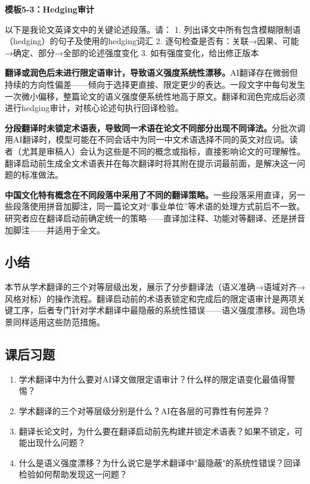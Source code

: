 \textbf{模板5-3：Hedging审计}

\begin{tcolorbox}[promptbox]
以下是我论文英译文中的关键论述段落。请：
1. 列出译文中所有包含模糊限制语（hedging）的句子及使用的hedging词汇
2. 逐句检查是否有：关联→因果、可能→确定、部分→全部的论述强度变化
3. 如有强度变化，给出修正版本
\end{tcolorbox}



\begin{mistakebox}

\textbf{翻译或润色后未进行限定语审计，导致语义强度系统性漂移。}AI翻译存在微弱但持续的方向性偏差——倾向于选择更直接、限定更少的表达。一段文字中每句发生一次微小偏移，整篇论文的语义强度便系统性地高于原文。翻译和润色完成后必须进行hedging审计，对核心论述句执行回译检验。

\smallskip

\textbf{分段翻译时未锁定术语表，导致同一术语在论文不同部分出现不同译法。}分批次调用AI翻译时，模型可能在不同会话中为同一中文术语选择不同的英文对应词。读者（尤其是审稿人）会认为这些是不同的概念或指标，直接影响论文的可理解性。翻译启动前生成全文术语表并在每次翻译时将其附在提示词最前面，是解决这一问题的标准做法。

\smallskip

\textbf{中国文化特有概念在不同段落中采用了不同的翻译策略。}一些段落采用直译，另一些段落使用拼音加脚注，同一篇论文对``事业单位''等术语的处理方式前后不一致。研究者应在翻译启动前确定统一的策略——直译加注释、功能对等翻译、还是拼音加脚注——并适用于全文。

\end{mistakebox}

\subsection*{小结}
本节从学术翻译的三个对等层级出发，展示了分步翻译法（语义准确→语域对齐→风格对标）的操作流程。翻译启动前的术语表锁定和完成后的限定语审计是两项关键工序，后者专门针对学术翻译中最隐蔽的系统性错误——语义强度漂移。润色场景同样适用这些防范措施。

\bigskip
\subsection*{课后习题}
\begin{enumerate}
\setlength{\itemsep}{6pt}

\item 学术翻译中为什么要对AI译文做限定语审计？什么样的限定语变化最值得警惕？

\item 学术翻译的三个对等层级分别是什么？AI在各层的可靠性有何差异？

\item 翻译长论文时，为什么要在翻译启动前先构建并锁定术语表？如果不锁定，可能出现什么问题？

\item 什么是语义强度漂移？为什么说它是学术翻译中"最隐蔽"的系统性错误？回译检验如何帮助发现这一问题？

\end{enumerate}
\newpage

